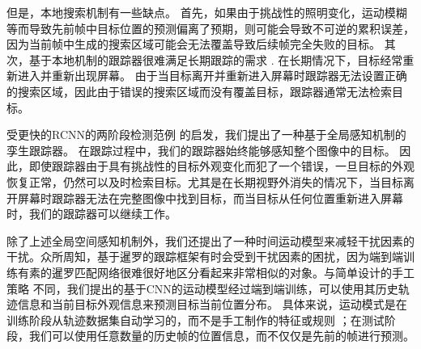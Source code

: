 但是，本地搜索机制有一些缺点。
首先，如果由于挑战性的照明变化，运动模糊等而导致先前帧中目标位置的预测偏离了预期，则可能会导致不可逆的累积误差，因为当前帧中生成的搜索区域可能会无法覆盖导致后续帧完全失败的目标。
其次，基于本地机制的跟踪器很难满足长期跟踪的需求 \cite{kalal2011tracking, hong2015multi}.
在长期情况下，目标经常重新进入并重新出现屏幕。
由于当目标离开并重新进入屏幕时跟踪器无法设置正确的搜索区域，因此由于错误的搜索区域而没有覆盖目标，跟踪器通常无法检索目标。

受更快的RCNN的两阶段检测范例 \cite{ren2015faster}的启发，我们提出了一种基于全局感知机制的孪生跟踪器。
在跟踪过程中，我们的跟踪器始终能够感知整个图像中的目标。
因此，即使跟踪器由于具有挑战性的目标外观变化而犯了一个错误，一旦目标的外观恢复正常，仍然可以及时检索目标。尤其是在长期视野外消失的情况下，当目标离开屏幕时跟踪器无法在完整图像中找到目标，而当目标从任何位置重新进入屏幕时，我们的跟踪器可以继续工作。

除了上述全局空间感知机制外，我们还提出了一种时间运动模型来减轻干扰因素的干扰。众所周知，基于暹罗的跟踪框架有时会受到干扰因素的困扰，因为端到端训练有素的暹罗匹配网络很难很好地区分看起来非常相似的对象。与简单设计的手工策略 \cite{SiamFC, SiamRPN}不同，我们提出的基于CNN的运动模型经过端到端训练，可以使用其历史轨迹信息和当前目标外观信息来预测目标当前位置分布。
具体来说，运动模式是在训练阶段从轨迹数据集自动学习的，而不是手工制作的特征或规则 \cite{iswanto2017visual}；在测试阶段，我们可以使用任意数量的历史帧的位置信息，而不仅仅是先前的帧进行预测。

